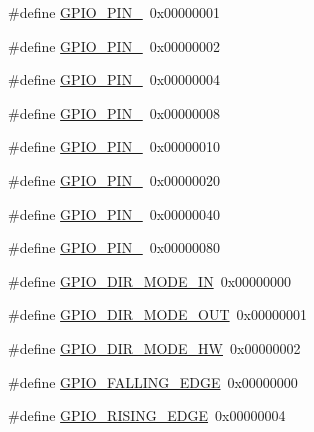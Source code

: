 \begin{DoxyCompactItemize}
\item 
\#define \hyperlink{_open_mote-_c_c2538_2source_2gpio_8h_a176efbf43a259b7bb0a85a47401505be}{G\+P\+I\+O\+\_\+\+P\+I\+N\+\_}~0x00000001
\item 
\#define \hyperlink{_open_mote-_c_c2538_2source_2gpio_8h_a6c35af4e75c3cb57bb650feaa7a136b5}{G\+P\+I\+O\+\_\+\+P\+I\+N\+\_}~0x00000002
\item 
\#define \hyperlink{_open_mote-_c_c2538_2source_2gpio_8h_a6eee38b797a7268f04357dfa2759efd2}{G\+P\+I\+O\+\_\+\+P\+I\+N\+\_}~0x00000004
\item 
\#define \hyperlink{_open_mote-_c_c2538_2source_2gpio_8h_adcaf899c018a0dde572b5af783565c62}{G\+P\+I\+O\+\_\+\+P\+I\+N\+\_}~0x00000008
\item 
\#define \hyperlink{_open_mote-_c_c2538_2source_2gpio_8h_ab3871e35868deecd260e586ad70d4b83}{G\+P\+I\+O\+\_\+\+P\+I\+N\+\_}~0x00000010
\item 
\#define \hyperlink{_open_mote-_c_c2538_2source_2gpio_8h_a01cc9ed93f6fd12fd3403362779aaa18}{G\+P\+I\+O\+\_\+\+P\+I\+N\+\_}~0x00000020
\item 
\#define \hyperlink{_open_mote-_c_c2538_2source_2gpio_8h_a9089f18f20ec88ee38ce6f27389e6d7e}{G\+P\+I\+O\+\_\+\+P\+I\+N\+\_}~0x00000040
\item 
\#define \hyperlink{_open_mote-_c_c2538_2source_2gpio_8h_a482cb86c2f036e630661a41e8986bcfe}{G\+P\+I\+O\+\_\+\+P\+I\+N\+\_}~0x00000080
\item 
\#define \hyperlink{_open_mote-_c_c2538_2source_2gpio_8h_a867e7cc468add48f46f6f3b9b2efea7c}{G\+P\+I\+O\+\_\+\+D\+I\+R\+\_\+\+M\+O\+D\+E\+\_\+\+IN}~0x00000000
\item 
\#define \hyperlink{_open_mote-_c_c2538_2source_2gpio_8h_a40794e768d87d9dcd3bf109251860adc}{G\+P\+I\+O\+\_\+\+D\+I\+R\+\_\+\+M\+O\+D\+E\+\_\+\+O\+UT}~0x00000001
\item 
\#define \hyperlink{_open_mote-_c_c2538_2source_2gpio_8h_a1919ac296ea0dee5eedafa96f93c0850}{G\+P\+I\+O\+\_\+\+D\+I\+R\+\_\+\+M\+O\+D\+E\+\_\+\+HW}~0x00000002
\item 
\#define \hyperlink{_open_mote-_c_c2538_2source_2gpio_8h_ae3f7c69a67f3780f8c6361df8418a36b}{G\+P\+I\+O\+\_\+\+F\+A\+L\+L\+I\+N\+G\+\_\+\+E\+D\+GE}~0x00000000
\item 
\#define \hyperlink{_open_mote-_c_c2538_2source_2gpio_8h_ab7f1524655feb8ef492ffa61e8325ead}{G\+P\+I\+O\+\_\+\+R\+I\+S\+I\+N\+G\+\_\+\+E\+D\+GE}~0x00000004
\item 

\end{DoxyCompactItemize}
